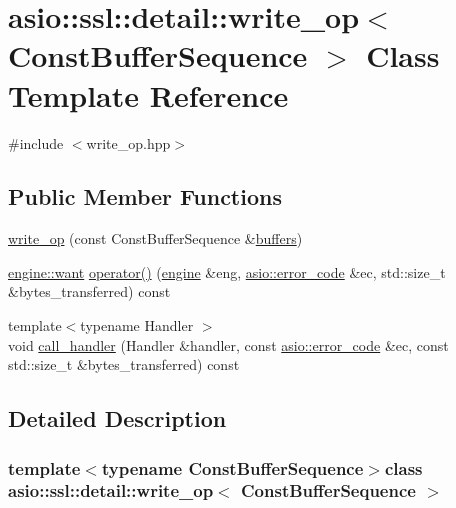 \hypertarget{classasio_1_1ssl_1_1detail_1_1write__op}{}\section{asio\+:\+:ssl\+:\+:detail\+:\+:write\+\_\+op$<$ Const\+Buffer\+Sequence $>$ Class Template Reference}
\label{classasio_1_1ssl_1_1detail_1_1write__op}


{\ttfamily \#include $<$write\+\_\+op.\+hpp$>$}

\subsection*{Public Member Functions}
\begin{DoxyCompactItemize}
\item 
\hyperlink{classasio_1_1ssl_1_1detail_1_1write__op_afa8530168fa8d8cd45bd9a66ab61c4a7}{write\+\_\+op} (const Const\+Buffer\+Sequence \&\hyperlink{group__async__read_ga54dede45c3175148a77fe6635222c47d}{buffers})
\item 
\hyperlink{classasio_1_1ssl_1_1detail_1_1engine_ab9812153941a6a93c9095f4e5ca8f915}{engine\+::want} \hyperlink{classasio_1_1ssl_1_1detail_1_1write__op_a66d1d76908822cc59b1684e60b299d35}{operator()} (\hyperlink{classasio_1_1ssl_1_1detail_1_1engine}{engine} \&eng, \hyperlink{classasio_1_1error__code}{asio\+::error\+\_\+code} \&ec, std\+::size\+\_\+t \&bytes\+\_\+transferred) const 
\item 
{\footnotesize template$<$typename Handler $>$ }\\void \hyperlink{classasio_1_1ssl_1_1detail_1_1write__op_a6422f60bcac30ff83dd205cbcd6c1328}{call\+\_\+handler} (Handler \&handler, const \hyperlink{classasio_1_1error__code}{asio\+::error\+\_\+code} \&ec, const std\+::size\+\_\+t \&bytes\+\_\+transferred) const 
\end{DoxyCompactItemize}


\subsection{Detailed Description}
\subsubsection*{template$<$typename Const\+Buffer\+Sequence$>$class asio\+::ssl\+::detail\+::write\+\_\+op$<$ Const\+Buffer\+Sequence $>$}



